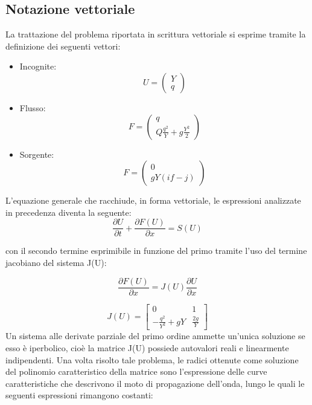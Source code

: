 \documentclass[12pt]{article} %
\begin{document}
\subsection{Notazione vettoriale}
\noindent La trattazione del problema riportata in scrittura vettoriale si esprime tramite la definizione dei seguenti vettori:
\begin{itemize}
    \item Incognite:
    \begin{equation}
        U=\begin{pmatrix}
            Y\\
            q
        \end{pmatrix}
    \end{equation}
    \item Flusso:
    \begin{equation}
        F=\begin{pmatrix}
            q\\
            Q\frac{q^2}{Y}+g\frac{Y^2}{2}
        \end{pmatrix}
    \end{equation}
    \item Sorgente:
    \begin{equation}
        F=\begin{pmatrix}
            0\\
            gY(if-j)
        \end{pmatrix}
    \end{equation}
\end{itemize}
L’equazione generale che racchiude, in forma vettoriale, le espressioni analizzate in precedenza diventa la seguente:
\begin{equation}
    \frac{\partial U}{\partial t}+\frac{\partial F(U)}{\partial x}=S(U)
\end{equation}

\noindent con il secondo termine esprimibile in funzione del primo tramite l’uso del termine jacobiano del sistema J(U):

\begin{equation}
    \frac{\partial F(U)}{\partial x}=J(U)\frac{\partial U}{\partial x}
\end{equation}

\begin{equation}
J(U)=\begin{bmatrix}
0 & 1\\
-\frac{q^2}{Y^2}+gY & \frac{2g}{Y}
\end{bmatrix}
\end{equation}
Un sistema alle derivate parziale del primo ordine ammette un’unica soluzione se esso è iperbolico, cioè la matrice J(U) possiede autovalori reali e linearmente indipendenti.
Una volta risolto tale problema, le radici ottenute come soluzione del polinomio caratteristico della matrice sono l’espressione delle curve caratteristiche che descrivono il moto di propagazione dell’onda, lungo le quali le seguenti espressioni rimangono costanti:
\end{document}
